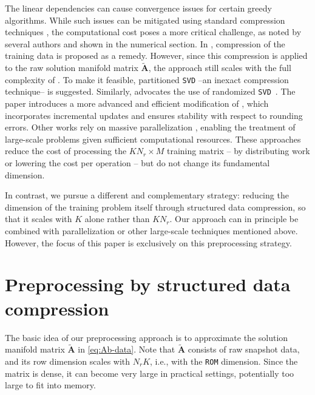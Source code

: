 \documentclass[onefignum,onetabnum]{siamart251104}
\newcommand{\bt}[1]{{\mathbf{#1}}}
\newcommand{\Nr}{{N_r}}
\newcommand{\acro}[1]{{\texttt{#1}}}  %
\newcommand{\Ap}{{\bt{A}}}
\begin{document}
The linear dependencies can cause convergence issues for certain greedy algorithms. While such issues can be mitigated using standard compression techniques \cite{art:globConv-onTheFly-hyperred, art:humphry2025efficient}, the computational cost poses a more critical challenge, as noted by several authors and shown in the numerical section. In \cite{art:hyperreduction-fem-cubature}, compression of the training data is proposed as a remedy. However, since this compression is applied to the raw solution manifold matrix $\tilde{\Ap}$, the approach still scales with the full complexity of . To make it feasible, partitioned \acro{SVD} --an inexact compression technique-- is suggested. Similarly, \cite{hernandez2024cecm} advocates the use of randomized \acro{SVD}~\cite{art:MartinssonVoronin2016}.
The paper \cite{art:humphry2025efficient} introduces a more advanced and efficient modification of , which incorporates incremental updates and ensures stability with respect to rounding errors.
Other works rely on massive parallelization \cite{art:equad-eff-yano,art:grimberg2021mesh}, enabling the treatment of large-scale problems given sufficient computational resources. These approaches reduce the cost of processing the $K\Nr \times M$ training matrix -- by distributing work or lowering the cost per operation -- but do not change its fundamental dimension.

In contrast, we pursue a different and complementary strategy: reducing the dimension of the training problem itself through structured data compression, so that it scales with $K$ alone rather than $K\Nr$. Our approach can in principle be combined with parallelization or other large-scale techniques mentioned above. However, the focus of this paper is exclusively on this preprocessing strategy.


\section{Preprocessing by structured data compression} \label{sec:preprocessing-ansatz}
The basic idea of our preprocessing approach is to approximate the solution manifold matrix $\tilde{\Ap}$ in \eqref{eq:Ab-data}.
Note that $\tilde{\Ap}$ consists of raw snapshot data, and its row dimension scales with $\Nr K$, i.e., with the \acro{ROM} dimension.
Since the matrix is dense, it can become very large in practical settings, potentially too large to fit into memory.
\end{document}
